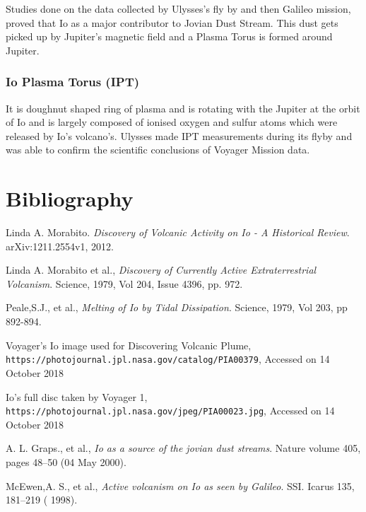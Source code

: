 \documentclass[a4paper,11pt,oneside]{article}
\begin{document}
Studies done on the data collected by Ulysses's fly by and then Galileo mission, proved that Io as a major contributor to Jovian Dust Stream.\cite{graps} This dust gets picked up by Jupiter's magnetic field and a Plasma Torus is formed around Jupiter.

\subsubsection{Io Plasma Torus (IPT)}
 It is doughnut shaped ring of plasma and is rotating with the Jupiter at the orbit of Io and is largely composed of ionised oxygen and sulfur atoms which were released by Io's volcano's. Ulysses made IPT measurements during its flyby and was able to confirm the scientific conclusions of Voyager Mission data.

\newpage

\section{Bibliography}
\begin{thebibliography}{9}
Linda A. Morabito. 
\textit{Discovery of Volcanic Activity on Io - A Historical Review}. 
arXiv:1211.2554v1, 2012.

Linda A. Morabito et al., 
\textit{Discovery of Currently Active Extraterrestrial Volcanism}. 
Science, 1979, Vol 204, Issue 4396, pp. 972.

Peale,S.J., et al., 
\textit{Melting of Io by Tidal Dissipation}. 
Science, 1979, Vol 203, pp 892-894.

Voyager's Io image used for Discovering Volcanic Plume,
\\\texttt{https://photojournal.jpl.nasa.gov/catalog/PIA00379}, Accessed on 14 October 2018

Io's full disc taken by Voyager 1,
\\\texttt{https://photojournal.jpl.nasa.gov/jpeg/PIA00023.jpg}, Accessed on 14 October 2018

A. L. Graps., et al., 
\textit{Io as a source of the jovian dust streams}. 
Nature volume 405, pages 48–50 (04 May 2000).

McEwen,A. S., et al., 
\textit{Active volcanism on Io as seen by Galileo}. 
SSI. Icarus 135, 181–219 ( 1998).

\end{thebibliography}
\end{document}
